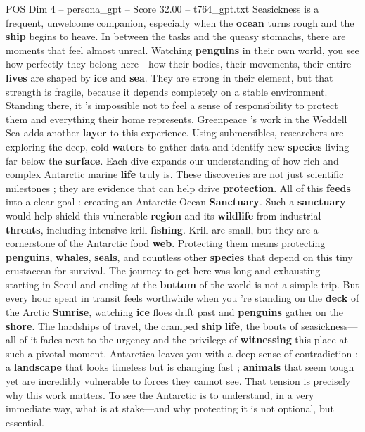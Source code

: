 \begin{textsample}{POS Dim 4 – persona\_gpt – Score 32.00 – t764\_gpt.txt}
Seasickness is a frequent, unwelcome companion, especially when the \textbf{ocean} turns rough and the \textbf{ship} begins to heave.
In between the tasks and the queasy stomachs, there are moments that feel almost unreal.
Watching \textbf{penguins} in their own world, you see how perfectly they belong here—how their bodies, their movements, their entire \textbf{lives} are shaped by \textbf{ice} and \textbf{sea}.
They are strong in their element, but that strength is fragile, because it depends completely on a stable environment.
Standing there, it ’s impossible not to feel a sense of responsibility to protect them and everything their home represents.
Greenpeace ’s work in the Weddell Sea adds another \textbf{layer} to this experience.
Using submersibles, researchers are exploring the deep, cold \textbf{waters} to gather data and identify new \textbf{species} living far below the \textbf{surface}.
Each dive expands our understanding of how rich and complex Antarctic marine \textbf{life} truly is.
These discoveries are not just scientific milestones ; they are evidence that can help drive \textbf{protection}.
All of this \textbf{feeds} into a clear goal : creating an Antarctic Ocean \textbf{Sanctuary}.
Such a \textbf{sanctuary} would help shield this vulnerable \textbf{region} and its \textbf{wildlife} from industrial \textbf{threats}, including intensive krill \textbf{fishing}.
Krill are small, but they are a cornerstone of the Antarctic food \textbf{web}.
Protecting them means protecting \textbf{penguins}, \textbf{whales}, \textbf{seals}, and countless other \textbf{species} that depend on this tiny crustacean for survival.
The journey to get here was long and exhausting—starting in Seoul and ending at the \textbf{bottom} of the world is not a simple trip.
But every hour spent in transit feels worthwhile when you ’re standing on the \textbf{deck} of the Arctic \textbf{Sunrise}, watching \textbf{ice} floes drift past and \textbf{penguins} gather on the \textbf{shore}.
The hardships of travel, the cramped \textbf{ship} \textbf{life}, the bouts of seasickness—all of it fades next to the urgency and the privilege of \textbf{witnessing} this place at such a pivotal moment.
Antarctica leaves you with a deep sense of contradiction : a \textbf{landscape} that looks timeless but is changing fast ; \textbf{animals} that seem tough yet are incredibly vulnerable to forces they cannot see.
That tension is precisely why this work matters.
To see the Antarctic is to understand, in a very immediate way, what is at stake—and why protecting it is not optional, but essential.

\end{textsample}
